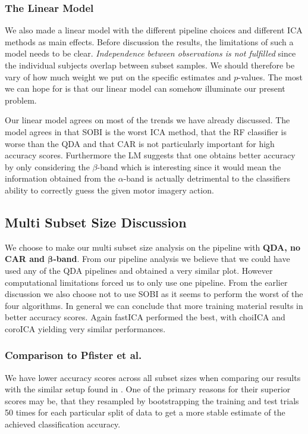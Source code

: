 	\subsubsection{The Linear Model}

	We also made a linear model with the different pipeline choices and different ICA methods as main effects. Before discussion the results, the limitations of such a model needs to be clear. \textit{Independence between observations is not fulfilled} since the individual subjects overlap between subset samples. We should therefore be vary of how much weight we put on the specific estimates and $p$-values. The most we can hope for is that our linear model can somehow illuminate our present problem. 

	Our linear model agrees on most of the trends we have already discussed. The model agrees in that SOBI is the worst ICA method, that the RF classifier is worse than the QDA and that CAR is not particularly important for high accuracy scores. Furthermore the LM suggests that one obtains better accuracy by only considering the $\beta$-band which is interesting since it would mean the information obtained from the $\alpha$-band is actually detrimental to the classifiers ability to correctly guess the given motor imagery action.

\subsection{Multi Subset Size Discussion}

	We choose to make our multi subset size analysis on the pipeline with \textbf{QDA, no CAR and $\bm\beta$-band}. From our pipeline analysis we believe that we could have used any of the QDA pipelines and obtained a very similar plot. However computational limitations forced us to only use one pipeline. From the earlier discussion we also choose not to use SOBI as it seems to perform the worst of the four algorithms. In general we can conclude that more training material results in better accuracy scores. Again fastICA performed the best, with choiICA and coroICA yielding very similar performances. 

	\subsubsection{Comparison to Pfister et al.} We have lower accuracy scores across all subset sizes when comparing our results with the similar setup found in \cite[p.42]{pfister2019} . One of the primary reasons for their superior scores may be, that they resampled by bootstrapping the training and test trials 50 times for each particular split of data to get a more stable estimate of the achieved classification accuracy. 


